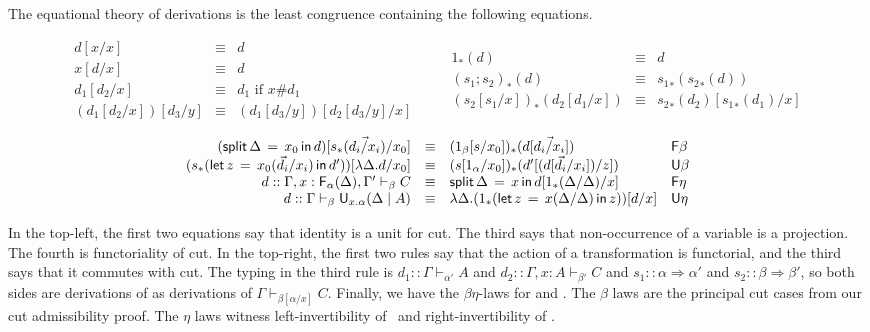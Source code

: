 \documentclass[a4paper,USenglish]{lipics-v2016}
\newcommand\D{\ensuremath{d}} %
\newcommand\deq{\ensuremath{\equiv}}
\newcommand\spr{\ensuremath{\Rightarrow}} %
\newcommand\seq[3]{\ensuremath{#1 \vdash_{#2} #3}}
\newcommand\F[2]{\ensuremath{\dsd{F}_{#1}(#2)}}
\newcommand\U[3]{\ensuremath{\dsd{U}_{#1}(#2 \mid #3)}}
\newcommand\Fsymb[0]{\dsd{F}}
\newcommand\Usymb[0]{\dsd{U}}
\renewcommand\subst[3]{\ensuremath{#1[#2/#3]}}
\newcommand\FLd[3]{\ensuremath{\dsd{split} \, #2 \, = \, {#1} \, \dsd{in} \, #3}}
\newcommand\FRd[3]{\ensuremath{\Trd{#2}{#3}}}
\newcommand\ULd[6]{\ensuremath{\Trd{#3}{\dsd{let} \, #5 \, = \, #1(#4) \, \dsd{in} \, #6 }}}
\newcommand\URd[2]{\ensuremath{\lambda #1.#2}}
\newcommand\Trd[2]{\ensuremath{#1_*(#2)}}
\newcommand\Ident[1]{\ensuremath{{#1}}}
\newcommand\Cut[3]{\ensuremath{#1[#2/#3]}}
\begin{document}
The equational theory of derivations is the least congruence containing
the following equations.  
\begin{small}
\[
\begin{array}{rcll} 
\Cut{\D}{\Ident{x}}{x} & \deq & \D \\
\Cut{\Ident{x}}{\D}{x} & \deq & \D \\
\Cut{\D_1}{\D_2}{x} & \deq & \D_1 \text{ if $x \# \D_1$}\\
\Cut{(\Cut{\D_1}{\D_2}{x})}{\D_3}{y} & \deq & \Cut{(\Cut{\D_1}{\D_3}{y})}{\Cut{\D_2}{\D_3}{y}}{x}\\
\end{array}
\qquad
\begin{array}{rcll}
\Trd{1}{\D} & \deq & \D\\
\Trd{(s_1;s_2)}{\D} & \deq & \Trd{{s_1}}{\Trd{{s_2}}{\D}} \\
\Trd{(\subst{s_2}{s_1}{x})}{\Cut{\D_2}{\D_1}{x}} & \deq & \Cut{\Trd{{s_2}}{\D_2}}{\Trd{{s_1}}{\D_1}}{x} \\
\end{array}
\]
\[
\begin{array}{rcll}
\Cut{(\FLd{x_0}{\Delta}{\D})}{\FRd{}{s}{\vec{\D_i/x_i}}}{x_0} & \deq & \Trd{(1_\beta[s/x_0])}{\D[\vec{\D_i/x_i}]} & \dsd{F\beta} \\
\Cut{(\ULd{x_0}{}{s}{\vec{\D_i}/x_i}{z}{\D'})}{\URd{\Delta}{\D}}{x_0} & \deq & \Trd{(s[1_{\alpha}/{x_0}])}{\Cut{\D'}{(\D[{\vec{d_i}/x_i}])}{z}} & \dsd{U\beta} \\
\D :: \seq{\Gamma,x:\F{\alpha}{\Delta},\Gamma'}{\beta}{C} & \deq &
\FLd{x}{\Delta}{\Cut{\D}{\FRd{}{1}{\Delta/\Delta}}{x}} & \dsd{F\eta}\\
\D :: \seq{\Gamma}{\beta}{\U{x.\alpha}{\Delta}{A}} & \deq & \URd{\Delta}{\Cut{(\ULd{x}{}{1}{\Delta/\Delta}{z}{z})}{\D}{x}} & \dsd{U\eta}\\
\end{array}
\]
\end{small}

In the top-left, the first two equations say that identity is a unit for
cut.  The third says that non-occurrence of a variable is a projection.
The fourth is functoriality of cut.  In the top-right, the first two
rules say that the action of a transformation is functorial, and the
third says that it commutes with cut.  The typing in the third rule is
$\D_1 :: \seq{\Gamma}{\alpha'}{A}$ and $\D_2 ::
\seq{\Gamma,x:A}{\beta'}{C}$ and $s_1 :: \alpha \spr \alpha'$ and $s_2
:: \beta \spr \beta'$, so both sides are derivations of as derivations
of \seq{\Gamma}{\subst{\beta}{\alpha}{x}}{C}.  Finally, we have the
$\beta\eta$-laws for  and .  The $\beta$ laws are the
principal cut cases from our cut admissibility proof.  The $\eta$ laws
witness left-invertibility of \Fsymb\, and right-invertibility of
\Usymb.
\end{document}
